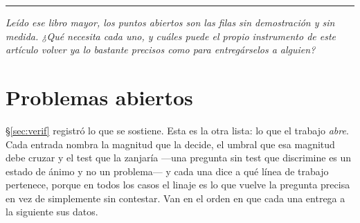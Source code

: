 \documentclass[11pt,a4paper]{article}
\newcommand{\bridge}[1]{\par\medskip\noindent
  \textcolor{hdrblue!45}{\rule{2.2cm}{0.6pt}}\;\;\parbox[t]{0.84\textwidth}{\small\itshape
  \textcolor{hdrblue!85}{#1}}\par\medskip}
\begin{document}
\bridge{Leído ese libro mayor, los puntos abiertos son las filas sin demostración y sin medida. ¿Qué
necesita cada uno, y cuáles puede el propio instrumento de este artículo volver ya lo bastante
precisos como para entregárselos a alguien?}

\section{Problemas abiertos}\label{sec:open}

\S\ref{sec:verif} registró lo que se sostiene. Esta es la otra lista: lo que el trabajo
\emph{abre}. Cada entrada nombra la magnitud que la decide, el umbral que esa magnitud debe cruzar y
el test que la zanjaría ---una pregunta sin test que discrimine es un estado de ánimo y no un
problema--- y cada una dice a qué línea de trabajo pertenece, porque en todos los casos el linaje es
lo que vuelve la pregunta precisa en vez de simplemente sin contestar. Van en el orden en que cada
una entrega a la siguiente sus datos.
\end{document}
